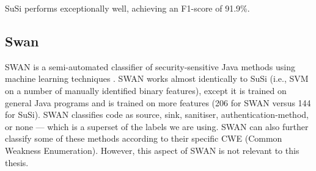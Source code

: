 \noindent
SuSi performs exceptionally well, achieving an F1-score of 91.9\%.

\subsection{Swan}

SWAN is a semi-automated classifier of security-sensitive Java methods using machine learning techniques \cite{swanassist}. SWAN works almost identically to SuSi (i.e., SVM on a number of manually identified binary features), except it is trained on general Java programs and is trained on more features (206 for SWAN versus 144 for SuSi). SWAN classifies code as source, sink, sanitiser, authentication-method, or none --- which is a superset of the labels we are using. SWAN can also further classify some of these methods according to their specific CWE (Common Weakness Enumeration). However, this aspect of SWAN is not relevant to this thesis. \\




